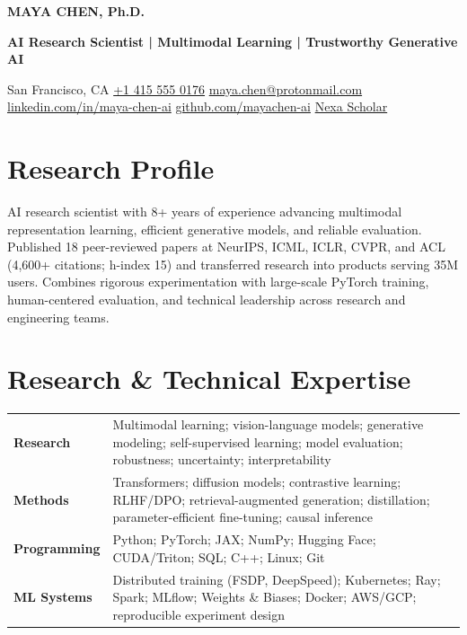 \documentclass[10pt,letterpaper]{article}
\newcommand{\contactsep}{\enspace\textcolor{Signal}{\textbullet}\enspace}
\newcommand{\skillrow}[2]{%
  \textbf{\color{Midnight}#1} & #2\\[1.5pt]
}
\begin{document}
\begin{center}
  {\fontsize{25}{28}\selectfont\bfseries\color{Midnight} MAYA CHEN, Ph.D.}\par
  \vspace{1pt}
  {\large\bfseries\color{Signal} AI Research Scientist \textcolor{Rule}{|} Multimodal Learning \textcolor{Rule}{|} Trustworthy Generative AI}\par
  \vspace{4pt}
  San Francisco, CA
  \contactsep \href{tel:+14155550176}{+1 415 555 0176}
  \contactsep \href{mailto:maya.chen@protonmail.com}{maya.chen@protonmail.com}\\[-1pt]
  \href{https://www.linkedin.com/in/maya-chen-ai}{linkedin.com/in/maya-chen-ai}
  \contactsep \href{https://github.com/mayachen-ai}{github.com/mayachen-ai}
  \contactsep \href{https://scholar.google.com/citations?user=MayaChenAI}{Nexa Scholar}
\end{center}
\vspace{-4pt}

\section*{Research Profile}
AI research scientist with 8+ years of experience advancing multimodal representation learning, efficient generative models, and reliable evaluation. Published 18 peer-reviewed papers at NeurIPS, ICML, ICLR, CVPR, and ACL (4,600+ citations; h-index 15) and transferred research into products serving 35M users. Combines rigorous experimentation with large-scale PyTorch training, human-centered evaluation, and technical leadership across research and engineering teams.

\section*{Research \& Technical Expertise}
\begin{tabularx}{\textwidth}{@{}>{\raggedright\arraybackslash}p{1.38in}X@{}}
\skillrow{Research}{Multimodal learning; vision-language models; generative modeling; self-supervised learning; model evaluation; robustness; uncertainty; interpretability}
\skillrow{Methods}{Transformers; diffusion models; contrastive learning; RLHF/DPO; retrieval-augmented generation; distillation; parameter-efficient fine-tuning; causal inference}
\skillrow{Programming}{Python; PyTorch; JAX; NumPy; Hugging Face; CUDA/Triton; SQL; C++; Linux; Git}
\skillrow{ML Systems}{Distributed training (FSDP, DeepSpeed); Kubernetes; Ray; Spark; MLflow; Weights \& Biases; Docker; AWS/GCP; reproducible experiment design}
\end{tabularx}
\end{document}
